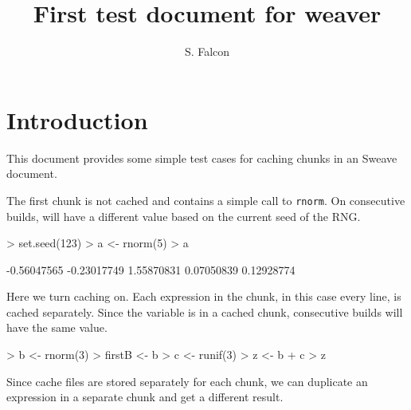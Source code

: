 \documentclass[11pt]{article}
\title{First test document for weaver}
\author{S. Falcon}
\newcommand{\Rfunction}[1]{{\texttt{#1}}}
\begin{document}
\maketitle

\section{Introduction}

This document provides some simple test cases for caching chunks in an
Sweave document.

The first chunk is not cached and contains a simple call to
\Rfunction{rnorm}.  On consecutive builds,  will have a
different value based on the current seed of the RNG.
\begin{Schunk}
\begin{Sinput}
> set.seed(123)
> a <- rnorm(5)
> a
\end{Sinput}
\begin{Soutput}
[1] -0.56047565 -0.23017749  1.55870831  0.07050839  0.12928774
\end{Soutput}
\end{Schunk}

Here we turn caching on.  Each expression in the chunk, in this case
every line, is cached separately.  Since the  variable is in
a cached chunk, consecutive builds will have the same value.

\begin{Schunk}
\begin{Sinput}
> b <- rnorm(3)
> firstB <- b
> c <- runif(3)
> z <- b + c
> z
\end{Sinput}
\end{Schunk}

Since cache files are stored separately for each chunk, we can
duplicate an expression in a separate chunk and get a different
result.
\end{document}

